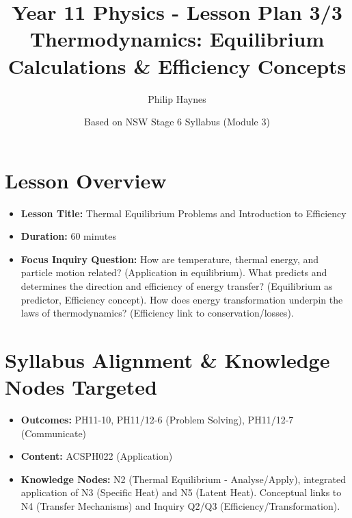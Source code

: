 \documentclass[11pt, a4paper]{article}
\title{Year 11 Physics - Lesson Plan 3/3 \\ Thermodynamics: Equilibrium Calculations & Efficiency Concepts}
\date{Based on NSW Stage 6 Syllabus (Module 3)}
\author{Philip Haynes}
\begin{document}
\maketitle
\vspace{-2em}

\section*{Lesson Overview}
\begin{itemize}
    \item \textbf{Lesson Title:} Thermal Equilibrium Problems and Introduction to Efficiency
    \item \textbf{Duration:} 60 minutes
    \item \textbf{Focus Inquiry Question:} How are temperature, thermal energy, and particle motion related? (Application in equilibrium). What predicts and determines the direction and efficiency of energy transfer? (Equilibrium as predictor, Efficiency concept). How does energy transformation underpin the laws of thermodynamics? (Efficiency link to conservation/losses).
\end{itemize}

\section*{Syllabus Alignment & Knowledge Nodes Targeted}
\begin{itemize}
    \item \textbf{Outcomes:} PH11-10, PH11/12-6 (Problem Solving), PH11/12-7 (Communicate)
    \item \textbf{Content:} ACSPH022 (Application)
    \item \textbf{Knowledge Nodes:} N2 (Thermal Equilibrium - Analyse/Apply), integrated application of N3 (Specific Heat) and N5 (Latent Heat). Conceptual links to N4 (Transfer Mechanisms) and Inquiry Q2/Q3 (Efficiency/Transformation).
\end{itemize}
\end{document}
